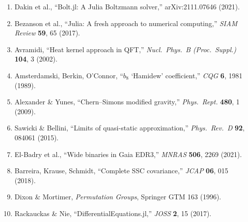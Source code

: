 \documentclass[11pt,a4paper]{article}
\begin{document}
\begin{enumerate}
\item Dakin et al., ``Bolt.jl: A Julia Boltzmann solver,'' arXiv:2111.07646 (2021).
\item Bezanson et al., ``Julia: A fresh approach to numerical computing,'' \textit{SIAM Review} \textbf{59}, 65 (2017).
\item Avramidi, ``Heat kernel approach in QFT,'' \textit{Nucl.\ Phys.\ B (Proc.\ Suppl.)} \textbf{104}, 3 (2002).
\item Amsterdamski, Berkin, O'Connor, ``$b_8$ `Hamidew' coefficient,'' \textit{CQG} \textbf{6}, 1981 (1989).
\item Alexander \& Yunes, ``Chern--Simons modified gravity,'' \textit{Phys.\ Rept.} \textbf{480}, 1 (2009).
\item Sawicki \& Bellini, ``Limits of quasi-static approximation,'' \textit{Phys.\ Rev.\ D} \textbf{92}, 084061 (2015).
\item El-Badry et al., ``Wide binaries in Gaia EDR3,'' \textit{MNRAS} \textbf{506}, 2269 (2021).
\item Barreira, Krause, Schmidt, ``Complete SSC covariance,'' \textit{JCAP} \textbf{06}, 015 (2018).
\item Dixon \& Mortimer, \textit{Permutation Groups}, Springer GTM 163 (1996).
\item Rackauckas \& Nie, ``DifferentialEquations.jl,'' \textit{JOSS} \textbf{2}, 15 (2017).
\end{enumerate}
\end{document}

